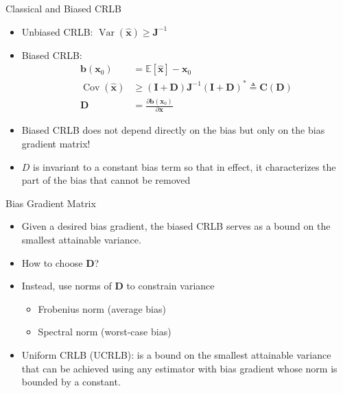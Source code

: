 \documentclass{beamer}
\begin{document}
\begin{frame}{Classical and Biased CRLB}
  \begin{itemize}
    \item Unbiased CRLB: $\operatorname{Var}(\hat{\mathbf{x}}) \geq \mathbf{J}^{-1}$
    \item Biased CRLB:
    \begin{equation*}
        \begin{aligned}
            \mathbf{b}(\mathbf{x}_0) &= \mathbb{E}[\hat{\mathbf{x}}] - \mathbf{x}_0 \\
            \operatorname{Cov}(\hat{\mathbf{x}}) &\geq (\mathbf{I} + \mathbf{D}) \mathbf{J}^{-1} 
            (\mathbf{I} + \mathbf{D})^* \triangleq \mathbf{C}(\mathbf{D}) \\
            \mathbf{D} &= \frac{\partial \mathbf{b}(\mathbf{x}_0)}{\partial \mathbf{x}}
        \end{aligned}
    \end{equation*}
    \item Biased CRLB does not depend directly on the bias but only on the bias gradient matrix!
    \item $D$ is invariant to a constant bias term so that in effect, it characterizes the part of the bias 
    that cannot be removed
  \end{itemize}
\end{frame}

\begin{frame}{Bias Gradient Matrix}
  \begin{itemize}
  \item Given a desired bias gradient, the biased CRLB serves as a bound on the smallest attainable variance.
  \item How to choose $\mathbf{D}$?
  \pause
  \item Instead, use norms of $\mathbf{D}$ to constrain variance
  \begin{itemize}
    \item Frobenius norm (average bias)
    \item Spectral norm (worst-case bias)
  \end{itemize}
  \item Uniform CRLB (UCRLB): is a bound on the smallest attainable
  variance that can be achieved using any estimator with bias gradient whose norm is bounded by a constant.
  \end{itemize}
\end{frame}
\end{document}
